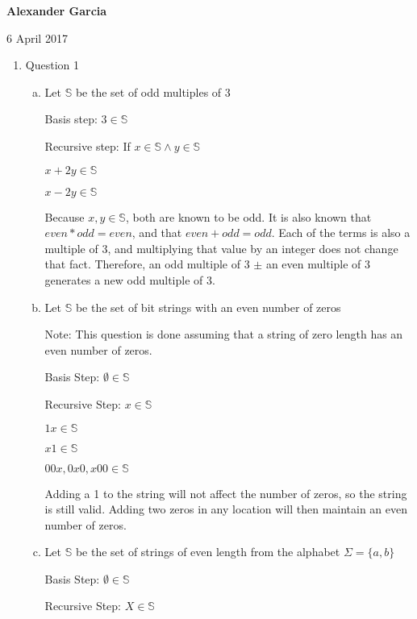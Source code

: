 \documentclass[11pt]{article}
\def\AND{\wedge}
\begin{document}
\textbf{Alexander Garcia}

6 April 2017 \\

\begin{enumerate}

	\item Question 1

		\begin{enumerate}[(a)]

			\item Let $\mathbb{S}$ be the set of odd multiples of 3

				Basis step: $3 \in \mathbb{S}$

				Recursive step: If $x \in \mathbb{S} \AND y \in \mathbb{S}$

				$x+2y \in \mathbb{S}$

				$x-2y \in \mathbb{S}$

				Because $x, y \in \mathbb{S}$, both are known to be odd. It is also
				known that $even * odd = even$, and that $even + odd = odd$. Each of the
				terms is also a multiple of 3, and multiplying that value by an integer
				does not change that fact. Therefore, an odd multiple of 3 $\pm$ an even multiple
				of 3 generates a new odd multiple of 3. \\

			\item Let $\mathbb{S}$ be the set of bit strings with an even number of zeros

				Note: This question is done assuming that a string of zero length
				has an even number of zeros.

				Basis Step: $\emptyset \in \mathbb{S}$

				Recursive Step: $x \in \mathbb{S}$

				$1x \in \mathbb{S}$

				$x1 \in \mathbb{S}$

				$00x, 0x0, x00 \in \mathbb{S}$

				Adding a 1 to the string will not affect the number of zeros, so the string
				is still valid. Adding two zeros in any location will then maintain an
				even number of zeros. \\

			\item Let $\mathbb{S}$ be the set of strings of even length
				from the alphabet $\Sigma = \{a, b\}$

				Basis Step: $\emptyset \in \mathbb{S}$

				Recursive Step: $X \in \mathbb{S}$


\end{enumerate}
\end{enumerate}
\end{document}
